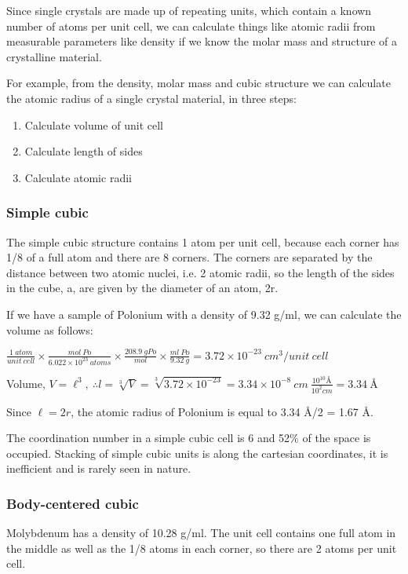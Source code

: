 \documentclass[ignorenonframetext]{beamer}
\begin{document}
Since single crystals are made up of repeating units, which contain a known number of atoms per unit cell, we can calculate things like atomic radii from measurable parameters like density if we know the molar mass and structure of a crystalline material.

For example, from the density, molar mass and cubic structure we can calculate the atomic radius of a single crystal material, in three steps:
\begin{enumerate}
\item Calculate volume of unit cell
\item Calculate length of sides
\item Calculate atomic radii
\end{enumerate}

\subsubsection{Simple cubic}
The simple cubic structure contains 1 atom per unit cell, because each corner has 1/8 of a full atom and there are 8 corners. The corners are separated by the distance between two atomic nuclei, i.e. 2 atomic radii, so the length of the sides in the cube, a, are given by the diameter of an atom, 2r.

If we have a sample of Polonium with a density of 9.32 g/ml, we can calculate the volume as follows:

\(\frac{1\ atom}{unit\ cell}\times\frac{mol\ Po}{6.022\times10^{23}\ atoms}\times\frac{208.9\ gPo}{mol}\times\frac{ml\ Po}{9.32\ g} = 3.72\times10^{-23}\ cm^3/unit\ cell\)

Volume, \(V = \ell^3,\ \therefore l = \sqrt[3]{V} = \sqrt[3]{3.72\times10^{-23}} = 3.34\times10^{-8}\ cm\ \frac{10^{10}\text{\AA}}{10^2cm} = 3.34\ \text{\AA}\)


Since \(\ell= 2r\), the atomic radius of Polonium is equal to 3.34 \AA /2 = 1.67 \AA .

The coordination number in a simple cubic cell is 6 and 52\% of the space is occupied. Stacking of simple cubic units is along the cartesian coordinates, it is inefficient and is rarely seen in nature.

\subsubsection{Body-centered cubic}

Molybdenum has a density of 10.28 g/ml. The unit cell contains one full atom in the middle as well as the 1/8 atoms in each corner, so there are 2 atoms per unit cell.
\end{document}
